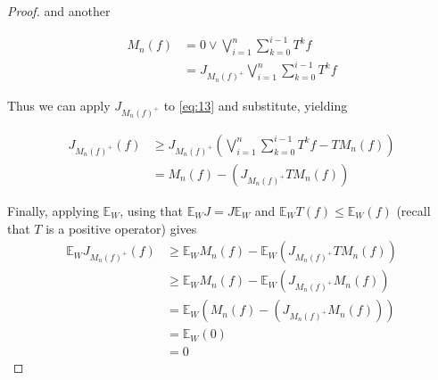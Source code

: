 \documentclass[letterpaper,10pt,oneside,onecolumn,reqno]{amsart}
\newcommand{\E}{\mathbb E}
\theoremstyle{definition}
\newcommand{\join}{\vee}
\begin{document}
\begin{proof}
  and another

  \begin{align}
    \label{eq:15}
    M_n(f) &= 0 \join \bigvee_{i=1}^n\sum\limits_{k=0}^{i-1} T^{k}f \\
    \label{eq:16}
    &= J_{M_n{(f)}^+}\bigvee_{i=1}^n\sum\limits_{k=0}^{i-1} T^{k}f
  \end{align}

  Thus we can apply $J_{M_n{(f)}^+}$ to \eqref{eq:13} and substitute,
  yielding

  \begin{align}
    \label{eq:17}
    J_{M_n{(f)}^+}(f) &\geq J_{M_n{(f)}^+}(\bigvee_{i=1}^{n}\sum\limits_{k=0}^{i-1} T^{k}f - TM_n(f)) \\
    \label{eq:18}
    &= M_n(f)-(J_{M_n{(f)}^+}TM_n(f))
  \end{align}

  Finally, applying $\E_W$, using that $\E_W J=J\E_W$ and $\E_W T(f)
  \leq \E_W(f) $ (recall that $T$ is a positive operator) gives
  \begin{align*}
    \label{eq:19}
    \E_W J_{M_n{(f)}^+}(f)&\geq \E_W M_n(f)-\E_W(J_{M_n{(f)}^+}TM_n(f)) \\
    &\geq \E_W M_n(f)-\E_W(J_{M_n{(f)}^+}M_n(f)) \\
    &= \E_W(M_n(f)-(J_{M_n{(f)}^+}M_n(f))) \\
    &= \E_W(0) \\
    &= 0
  \end{align*}

\end{proof}
 
\printindex
\end{document}
